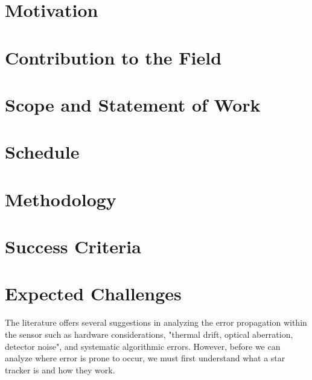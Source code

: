 \section{Motivation}

\section{Contribution to the Field}

\section{Scope and Statement of Work}

\section{Schedule}

\section{Methodology}

\section{Success Criteria}

\section{Expected Challenges}

\par \qquad The literature offers several suggestions in analyzing the error propagation within the sensor such as hardware considerations, "thermal drift, optical aberration, detector noise"\cite{systematic_error_analysis_of_star_tracker_centroiding}, and systematic algorithmic errors.
However, before we can analyze where error is prone to occur, we must first understand what a star tracker is and how they work.